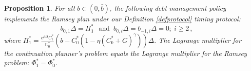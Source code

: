 \documentclass[12pt]{article}
\newtheorem{proposition}{Proposition}
\newcommand{\TS}[1]{{\textcolor{magenta}{#1}}}
\begin{document}

\begin{proposition}\label{corollary1}
	 For  all $b\in (0, \bar b)$, %
	 the following debt management policy  implements the  Ramsey plan under our  Definition \ref{defprotocol} timing protocol: %
	\begin{equation}\label{restructure_debt_dny}
	{b}_{0, 1}\Delta= \Pi_{{1}}^* \, \;\; \text{and} \;\;  b_{0, i}\Delta = b_{-1, i}\Delta=0 ; \; i\geq 2\,,
\end{equation}
where $\Pi_{1}^* = \frac{e^{\rho \Delta}C_1^*}{C_0^*}\left(b-C_0^*\left( 1-\eta(C_0^*+G)^\gamma\right) \right)\Delta$. {The Lagrange multiplier for the continuation   planner's problem equals the Lagrange multiplier for the  Ramsey problem:  $\Phi_1^\ast = \Phi_0^\ast$}.
\end{proposition} 



%
%
\end{document}
